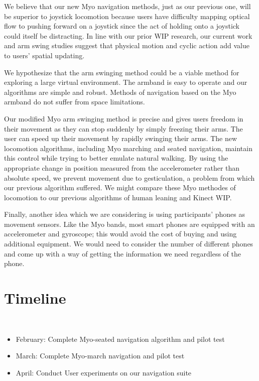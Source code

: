 \documentclass{vgtc}                          %
\begin{document}

We believe that our new Myo navigation methods, just as our previous one, will be superior to joystick locomotion because
users have difficulty mapping optical flow to pushing forward on a joystick since the act of holding onto a joystick could
itself be distracting.
In line with our prior WIP research, our current work and arm swing studies suggest that physical motion and cyclic action add
value to users' spatial updating.

We hypothesize that the arm swinging method could be a viable method
for exploring a large virtual environment.
The armband is easy to operate and our algorithms are simple and robust.
Methods of navigation based on the Myo armband do not suffer from space limitations.

Our modified Myo arm swinging method is precise and gives users freedom in their movement as they can
stop suddenly by simply freezing their arms.
The user can speed up their movement by rapidly swinging their arms.
The new locomotion algorithms, including Myo marching and seated navigation,
maintain this control while trying to better emulate natural walking.
By using the appropriate change in position measured from the accelerometer rather than absolute speed,
we prevent movement due to gesticulation, a problem from which our previous algorithm suffered.
We might compare these Myo methodes of locomotion to our previous algorithms of human leaning and Kinect WIP.

Finally, another idea which we are considering is using participants' phones as movement sensors.
Like the Myo bands, most smart phones are equipped with an accelerometer and gyroscope;
this would avoid the cost of buying and using additional equipment.
We would need to consider the number of different phones
and come up with a way of getting the information we need regardless of the phone.

\section{Timeline}
\
\begin{itemize}
\item February: Complete Myo-seated navigation algorithm and pilot test
\item March: Complete Myo-march navigation and pilot test
\item April: Conduct User experiments on our navigation suite
\end{itemize}




\end{document}
